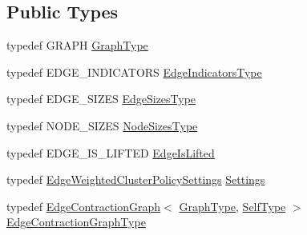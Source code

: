 \subsection*{Public Types}
\begin{DoxyCompactItemize}
\item 
typedef G\+R\+A\+P\+H \hyperlink{classnifty_1_1graph_1_1agglo_1_1LiftedGraphEdgeWeightedClusterPolicy_ae3d069ea1fd066a37e1c816c0bf50b83}{Graph\+Type}
\item 
typedef E\+D\+G\+E\+\_\+\+I\+N\+D\+I\+C\+A\+T\+O\+R\+S \hyperlink{classnifty_1_1graph_1_1agglo_1_1LiftedGraphEdgeWeightedClusterPolicy_ad0813aa75f1e76d10b794cab88615f61}{Edge\+Indicators\+Type}
\item 
typedef E\+D\+G\+E\+\_\+\+S\+I\+Z\+E\+S \hyperlink{classnifty_1_1graph_1_1agglo_1_1LiftedGraphEdgeWeightedClusterPolicy_ad63cc4f759cd05f1bf9b7fec48629221}{Edge\+Sizes\+Type}
\item 
typedef N\+O\+D\+E\+\_\+\+S\+I\+Z\+E\+S \hyperlink{classnifty_1_1graph_1_1agglo_1_1LiftedGraphEdgeWeightedClusterPolicy_a83ef319d77186be2fc3957ed06f0a8f1}{Node\+Sizes\+Type}
\item 
typedef E\+D\+G\+E\+\_\+\+I\+S\+\_\+\+L\+I\+F\+T\+E\+D \hyperlink{classnifty_1_1graph_1_1agglo_1_1LiftedGraphEdgeWeightedClusterPolicy_ad104d8984e0964ccfb7d1ec06ee977a2}{Edge\+Is\+Lifted}
\item 
typedef \hyperlink{structnifty_1_1graph_1_1agglo_1_1EdgeWeightedClusterPolicySettings}{Edge\+Weighted\+Cluster\+Policy\+Settings} \hyperlink{classnifty_1_1graph_1_1agglo_1_1LiftedGraphEdgeWeightedClusterPolicy_aeaf1751bd20abe54b45e4c9249cec518}{Settings}
\item 
typedef \hyperlink{classnifty_1_1graph_1_1EdgeContractionGraph}{Edge\+Contraction\+Graph}$<$ \hyperlink{classnifty_1_1graph_1_1agglo_1_1LiftedGraphEdgeWeightedClusterPolicy_ae3d069ea1fd066a37e1c816c0bf50b83}{Graph\+Type}, \hyperlink{classnifty_1_1graph_1_1agglo_1_1LiftedGraphEdgeWeightedClusterPolicy}{Self\+Type} $>$ \hyperlink{classnifty_1_1graph_1_1agglo_1_1LiftedGraphEdgeWeightedClusterPolicy_a316c395d0d3bcc00ddbed21302419354}{Edge\+Contraction\+Graph\+Type}
\end{DoxyCompactItemize}

